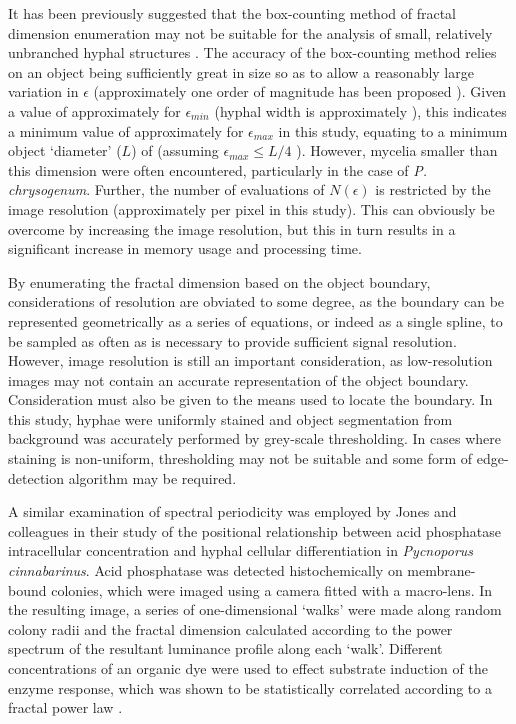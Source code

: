 It has been previously suggested that the box-counting method of fractal dimension enumeration may not be suitable for the analysis of small, relatively unbranched hyphal structures \cite{papagianni2006b,obert1990}. The accuracy of the box-counting method relies on an object being sufficiently great in size so as to allow a reasonably large variation in $\epsilon$ (approximately one order of magnitude has been proposed \cite{obert1990}). Given a value of approximately  for $\epsilon_{min}$ (hyphal width is approximately ), this indicates a minimum value of approximately  for $\epsilon_{max}$ in this study, equating to a minimum object \lq diameter' ($L$) of  (assuming $\epsilon_{max} \leq L/4$ \cite{obert1990}). However, mycelia smaller than this dimension were often encountered, particularly in the case of \emph{P. chrysogenum}. Further, the number of evaluations of $N(\epsilon)$ is restricted by the image resolution (approximately  per pixel in this study). This can obviously be overcome by increasing the image resolution, but this in turn results in a significant increase in memory usage and processing time.

By enumerating the fractal dimension based on the object boundary, considerations of resolution are obviated to some degree, as the boundary can be represented geometrically as a series of equations, or indeed as a single spline, to be sampled as often as is necessary to provide sufficient signal resolution. However, image resolution is still an important consideration, as low-resolution images may not contain an accurate representation of the object boundary. Consideration must also be given to the means used to locate the boundary. In this study, hyphae were uniformly stained and object segmentation from background was accurately performed by grey-scale thresholding. In cases where staining is non-uniform, thresholding may not be suitable and some form of edge-detection algorithm may be required. 

A similar examination of spectral periodicity was employed by Jones and colleagues in their study of the positional relationship between acid phosphatase intracellular concentration and hyphal cellular differentiation in \emph{Pycnoporus cinnabarinus}. Acid phosphatase was detected histochemically on membrane-bound colonies, which were imaged using a camera fitted with a macro-lens. In the resulting image, a series of one-dimensional \lq walks' were made along random colony radii and the fractal dimension calculated according to the power spectrum of the resultant luminance profile along each \lq walk'. Different concentrations of an organic dye were used to effect substrate induction of the enzyme response, which was shown to be statistically correlated according to a fractal power law \cite{jones1995}.

